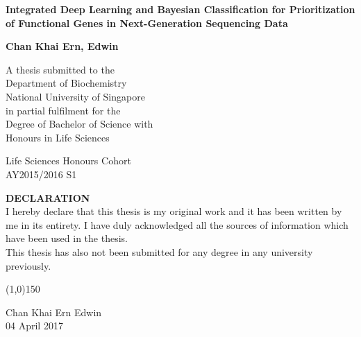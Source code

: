 \documentclass{article}
\begin{document}
\begin{titlepage}


    \begin{center} 
	\Large
        \vspace*{1cm}
        
        \textbf{ Integrated Deep Learning and Bayesian Classification for Prioritization of Functional Genes in Next-Generation Sequencing Data }
        
        \vspace{0.5cm}
        
        \vspace{1.0cm}
        
        \textbf{Chan Khai Ern, Edwin}
        
\vspace{9.0cm}
        \normalsize
       A thesis submitted to the \\
Department of Biochemistry \\
National University of Singapore \\
in partial fulfilment for the \\
Degree of Bachelor of Science with \\Honours
in
Life Sciences\\

        
        \vspace{1.5cm}
        
        
        Life Sciences Honours Cohort \\
        AY2015/2016 S1\\
       
        
    \end{center}
\end{titlepage}
\newpage\null\thispagestyle{empty}\newpage
\newpage
{} 
\doublespace
\large
\vspace*{50px}


\begin{center}
\textbf{DECLARATION}\\[\baselineskip]
I hereby declare that this thesis is my original work and it has been written by me in its entirety. I have duly acknowledged all the sources of information which have been used in the thesis.\\[\baselineskip]
This thesis has also not been submitted for any degree in any university previously.\\[3\baselineskip]
\begin{center}
\line(1,0){150}
\end{center}
Chan Khai Ern Edwin\\
04 April 2017
\end{center}
\newpage
\end{document}
